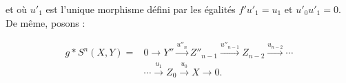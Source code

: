\begin{center}
\end{center}
et où $u'_1$ est l'unique morphisme défini par les égalités
$f'u'_1=u_1$ et $u'_0u'_1=0$. De même, posons :

\begin{equation}
\begin{aligned}
g*S^n(X,Y)={}&0\longrightarrow Y''\xrightarrow{u''_n}Z''_{n-1}
\xrightarrow{u''_{n-1}}Z_{n-2}\xrightarrow{u_{n-2}}\cdots\\
&\cdots\xrightarrow{u_1}Z_0\xrightarrow{u_0}X\longrightarrow0.
\end{aligned}
\tag{3.2.8.2}
\end{equation}
\endgroup
